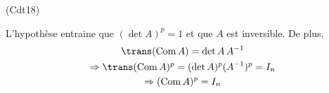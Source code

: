 \begin{tiny}(Cdt18)\end{tiny} L'hypothèse entraine que $(\det A)^p=1$ et que $A$ est inversible. De plus,
\begin{multline*}
 \trans (\mathrm{Com }\,A ) = \det A \, A^{-1}\\
\Rightarrow \trans (\mathrm{Com }\,A )^p = (\det A)^p (A^{-1})^p = I_n\\
\Rightarrow (\mathrm{Com }\,A )^p = I_n
\end{multline*}
 